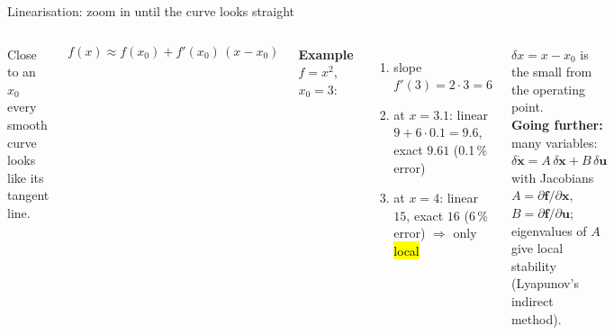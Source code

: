 \documentclass[aspectratio=169,10pt]{beamer}
\newcommand{\further}[1]{{\color{mkGray}\scriptsize\textbf{Going further:} #1}}
\begin{document}
\begin{frame}{Linearisation: zoom in until the curve looks straight}
\begin{columns}[T]
\centering
{}
\small
Close to an  $x_0$ every smooth curve looks like its tangent line.
\begin{eqbox}
\[
f(x)\approx f(x_0)+f'(x_0)\,(x-x_0)
\]
\end{eqbox}
\footnotesize
\textbf{Example} $f=x^2$, $x_0=3$:
\begin{enumerate}
  \item slope $f'(3)=2\cdot3=6$
  \item at $x=3.1$: linear $9+6\cdot0.1=9.6$, exact $9.61$ (0.1\,\% error)
  \item at $x=4$: linear $15$, exact $16$ (6\,\% error) $\Rightarrow$ only \hl{local}
\end{enumerate}
$\delta x=x-x_0$ is the small  from the operating point.\\[2pt]
\further{many variables: $\delta\dot{\bm x}=A\,\delta\bm x+B\,\delta\bm u$ with Jacobians $A=\partial\bm f/\partial\bm x$, $B=\partial\bm f/\partial\bm u$; eigenvalues of $A$ give local stability (Lyapunov's indirect method).}
\end{columns}
\end{frame}
\end{document}
